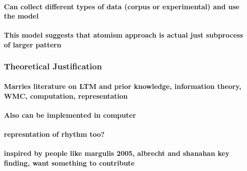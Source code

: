 \documentclass[]{book}
\let\oldparagraph\paragraph
\renewcommand{\paragraph}[1]{\oldparagraph{#1}\mbox{}}
\theoremstyle{definition}
\theoremstyle{definition}
\theoremstyle{definition}
\theoremstyle{remark}
\begin{document}
\hypertarget{can-collect-different-types-of-data-corpus-or-experimental-and-use-the-model}{%
\paragraph{Can collect different types of data (corpus or experimental)
and use the
model}\label{can-collect-different-types-of-data-corpus-or-experimental-and-use-the-model}}

\hypertarget{this-model-suggests-that-atomism-approach-is-actual-just-subprocess-of-larger-pattern}{%
\paragraph{This model suggests that atomism approach is actual just
subprocess of larger
pattern}\label{this-model-suggests-that-atomism-approach-is-actual-just-subprocess-of-larger-pattern}}

\hypertarget{theoretical-justification}{%
\subsubsection{Theoretical
Justification}\label{theoretical-justification}}

\hypertarget{marries-literature-on-ltm-and-prior-knowledge-information-theory-wmc-computation-representation}{%
\paragraph{Marries literature on LTM and prior knowledge, information
theory, WMC, computation,
representation}\label{marries-literature-on-ltm-and-prior-knowledge-information-theory-wmc-computation-representation}}

\hypertarget{also-can-be-implemented-in-computer}{%
\paragraph{Also can be implemented in
computer}\label{also-can-be-implemented-in-computer}}

\hypertarget{represntation-of-rhythm-too}{%
\paragraph{represntation of rhythm
too?}\label{represntation-of-rhythm-too}}

\hypertarget{inspired-by-people-like-margulis-2005-albrecht-and-shanahan-key-finding-want-something-to-contribute}{%
\paragraph{inspired by people like margulis 2005, albrecht and shanahan
key finding, want something to
contribute}\label{inspired-by-people-like-margulis-2005-albrecht-and-shanahan-key-finding-want-something-to-contribute}}
\end{document}
